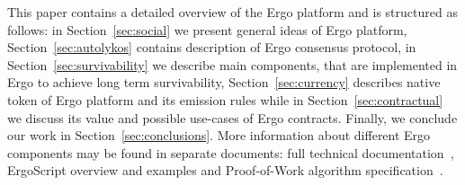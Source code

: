 This paper contains a detailed overview of the Ergo platform %
and is structured as follows: in Section~\ref{sec:social} we present general ideas of Ergo platform,
Section~\ref{sec:autolykos} contains description of Ergo consensus protocol,
in Section~\ref{sec:survivability} we describe main components, that are implemented in Ergo
to achieve long term survivability, Section~\ref{sec:currency} describes native token
of Ergo platform and its emission rules while in Section~\ref{sec:contractual} we
discuss its value and possible use-cases of Ergo contracts.
Finally, we conclude our work in Section~\ref{sec:conclusions}.
More information about different Ergo components may be found in separate documents:
full technical documentation~\cite{yellowpaper}, ErgoScript overview and examples\cite{???,???} and
Proof-of-Work algorithm specification~\cite{Ergopow}.
